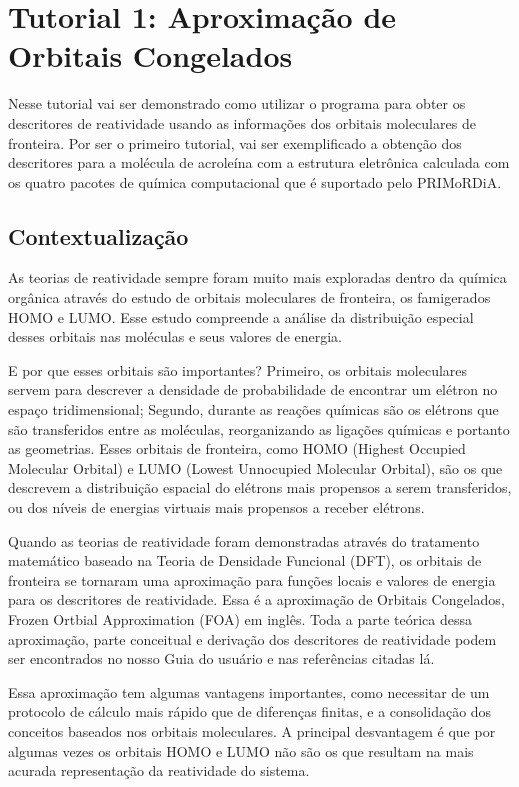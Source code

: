 \documentclass[a4paper,11pt]{refart}
\begin{document}
\newpage
\section{Tutorial 1: Aproximação de Orbitais Congelados}

Nesse tutorial vai ser demonstrado como utilizar o programa para obter os descritores de reatividade usando as informações dos orbitais moleculares de fronteira. Por ser o primeiro tutorial, vai ser exemplificado a obtenção dos descritores para a molécula de acroleína com a estrutura eletrônica calculada com os quatro pacotes de química computacional que é suportado pelo PRIMoRDiA.

\subsection{Contextualização}

As teorias de reatividade sempre foram muito mais exploradas dentro da química orgânica através do estudo de orbitais moleculares de fronteira, os famigerados HOMO e LUMO. Esse estudo compreende a análise da distribuição especial desses orbitais nas moléculas e seus valores de energia.

E por que esses orbitais são importantes? Primeiro, os orbitais moleculares servem para descrever a densidade de probabilidade de encontrar um elétron no espaço tridimensional; Segundo, durante as reações químicas são os elétrons que são transferidos entre as moléculas, reorganizando as ligações químicas e portanto as geometrias. Esses orbitais de fronteira, como HOMO (Highest Occupied Molecular Orbital) e LUMO (Lowest Unnocupied Molecular Orbital), são os que descrevem a distribuição espacial do elétrons mais propensos a serem transferidos, ou dos níveis de energias virtuais mais propensos a receber elétrons.

Quando as teorias de reatividade foram demonstradas através do tratamento matemático baseado na Teoria de Densidade Funcional (DFT), os orbitais de fronteira se tornaram uma aproximação para funções locais e valores de energia para os descritores de reatividade. Essa é a aproximação de Orbitais Congelados, Frozen Ortbial Approximation (FOA) em inglês. Toda a parte teórica dessa aproximação, parte conceitual e derivação dos descritores de reatividade podem ser encontrados no nosso Guia do usuário e nas referências citadas lá. 

Essa aproximação tem algumas vantagens importantes, como necessitar de um protocolo de cálculo mais rápido que de diferenças finitas, e a consolidação dos conceitos baseados nos orbitais moleculares. A principal desvantagem é que por algumas vezes os orbitais HOMO e LUMO não são os que resultam na mais acurada representação da reatividade do sistema.
\end{document}
